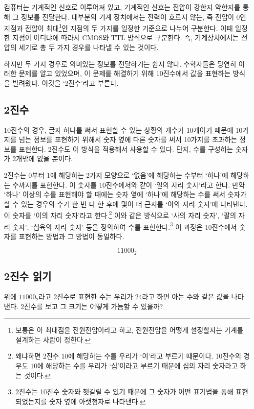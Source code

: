 \documentclass{article}
\begin{document}
컴퓨터는 기계적인 신호로 이루어져 있고, 기계적인 신호는 전압이 강한지 약한지를 통해
그 정보를 전달한다. 대부분의 기계 장치에서는 전력이 흐르지 않는, 즉 전압이 0인 지점과
전압이 최대\footnote{보통은 이 최대점을 전원전압이라고 하고, 전원전압을 어떻게
설정할지는 기계를 설계하는 사람이 정한다.}인
지점의 두 가지를 일정한 기준으로 나누어 구분한다.
이때 일정한 지점이 어디냐에 따라서 CMOS와 TTL 방식으로 구분한다.
즉, 기계장치에서는 전압의 세기로 총 두 가지 경우를 나타낼 수 있는 것이다.

하지만 두 가지 경우로 의미있는 정보를 전달하기는 쉽지 않다. 수학자들은 당연히 이러한
문제를 알고 있었으며, 이 문제를 해결하기 위해 10진수에서 값을 표현하는 방식을 빌려왔다.
이것을 `2진수'라고 부른다.

\subsection{2진수}

10진수의 경우, 글자 하나를 써서 표현할 수 있는 상황의 개수가
10개이기 때문에 10가지를 넘는 정보를 표현하기 위해서 숫자 옆에 다른 숫자를 써서
10가지를 초과하는 정보를 표현한다. 2진수도 이 방식을 적용해서 사용할 수 있다.
단지, 수를 구성하는 숫자가 2개밖에 없을 뿐이다.

2진수는 0부터 1에 해당하는 2가지 모양으로 `없음'에 해당하는 수부터 `하나'에
해당하는 수까지를 표현한다. 이 숫자를 10진수에서와 같이 `일의 자리 숫자'라고 한다.
만약 `하나' 이상의 수를 표현해야 할 때에는 숫자 옆에 `하나'에 해당하는 수를 써서
숫자가 할 수 있는 경우의 수가 한 번 다 한 후에 몇이 더 큰지를 `이의 자리 숫자'에
나타낸다. 이 숫자를 `이의 자리 숫자'라고 한다.\footnote{왜냐하면 2진수 $10$에
해당하는 수를 우리가 `이'라고 부르기 때문이다. 10진수의 경우도 $10$에 해당하는
수를 우리가 `십'이라고 부르기 때문에 십의 자리 숫자라고 하는 것이다.}
이와 같은 방식으로 `사의 자리 숫자', `팔의 자리 숫자', `십육의 자리 숫자' 등을
정의하여 수를 표현한다.\footnote{2진수는 10진수 숫자와 헷갈릴 수 있기 때문에 
그 숫자가 어떤 표기법을 통해 표현되었는지를 숫자 옆에 아랫첨자로 나타낸다.}
이 과정은 10진수에서 숫자를 표현하는 방법과 그 방법이 동일하다.

$$
11000_2
$$

\subsection{2진수 읽기}

위에 $11000_2$라고 2진수로 표현한 수는 우리가 $24$라고 하면 아는 수와 같은 값을
나타낸다. 2진수를 보고 그 크기는 어떻게 가늠할 수 있을까?
\end{document}
